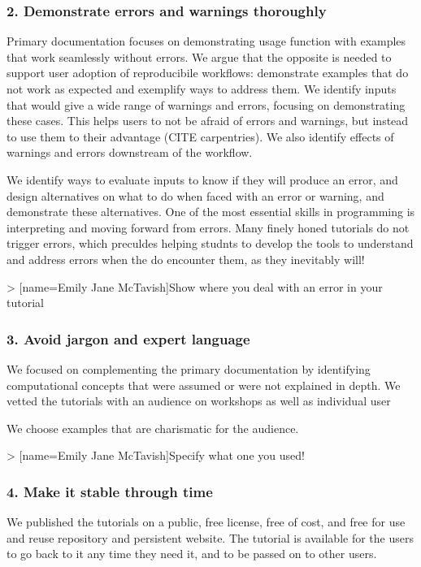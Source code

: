 \documentclass[12pt]{article}
\begin{document}
\subsubsection*{2. Demonstrate errors and warnings thoroughly}

Primary documentation focuses on demonstrating usage function with examples that work seamlessly without errors. We argue that the opposite is needed to support user adoption of reproducibile workflows: demonstrate examples that do not work as expected and exemplify ways to address them. We identify inputs that would give a wide range of warnings and errors, focusing on demonstrating these cases. This helps users to not be afraid of errors and warnings, but instead to use them to their advantage (CITE carpentries).
We also identify effects of warnings and errors downstream of the workflow.

We identify ways to evaluate inputs to know if they will produce an error, and design alternatives on what to do when faced with an error or warning, and demonstrate these alternatives.
One of the most essential skills in programming is interpreting and moving forward from errors.
Many finely honed tutorials do not trigger errors, which preculdes helping studnts to develop the tools to understand and address errors when the do encounter them, as they inevitably will!

> [name=Emily Jane McTavish]Show where you deal with an error in your tutorial

\subsubsection*{3. Avoid jargon and expert language}

We focused on complementing the primary documentation by identifying computational concepts that were assumed or were not explained in depth.
We vetted the tutorials with an audience on workshops as well as individual user

We choose examples that are charismatic for the audience.

> [name=Emily Jane McTavish]Specify what one you used!


\subsubsection*{4. Make it stable through time}

We published the tutorials on a public, free license, free of cost, and free for use and reuse repository and persistent website.
The tutorial is available for the users to go back to it any time they need it, and to be passed on to other users.
\end{document}
